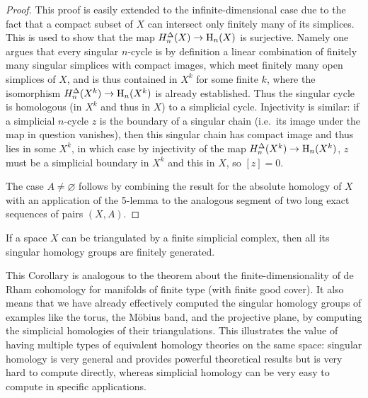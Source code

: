 \begin{proof}
    This proof is easily extended to the infinite-dimensional case due to the fact that a compact subset of $X$ can intersect only finitely many of its simplices. This is used to show that the map $H^\Delta_n(X)\to \mathrm{H}_n(X)$ is surjective. Namely one argues that every singular $n$-cycle is by definition a linear combination of finitely many singular simplices with compact images, which meet finitely many open simplices of $X$, and is thus contained in $X^k$ for some finite $k$, where the isomorphism $H^\Delta_n(X^k)\to \mathrm{H}_n(X^k)$ is already established. Thus the singular cycle is homologous (in $X^k$ and thus in $X$) to a simplicial cycle. Injectivity is similar: if a simplicial $n$-cycle $z$ is the boundary of a singular chain (i.e.\ its image under the map in question vanishes), then this singular chain has compact image and thus lies in some $X^k$, in which case by injectivity of the map $H^\Delta_n(X^k)\to \mathrm{H}_n(X^k)$, $z$ must be a simplicial boundary in $X^k$ and this in $X$, so $[z]=0$. 
    
    The case $A\neq\varnothing$ follows by combining the result for the absolute homology of $X$ with an application of the 5-lemma to the analogous segment of two long exact sequences of pairs $(X,A)$.
\end{proof}

\begin{cor}
    If a space $X$ can be triangulated by a finite simplicial complex, then all its singular homology groups are finitely generated.
\end{cor}

This Corollary is analogous to the theorem about the finite-dimensionality of de Rham cohomology for manifolds of finite type (with finite good cover). It also means that we have already effectively computed the singular homology groups of examples like the torus, the M\"obius band, and the projective plane, by computing the simplicial homologies of their triangulations. This illustrates the value of having multiple types of equivalent homology theories on the same space: singular homology is very general and provides powerful theoretical results but is very hard to compute directly, whereas simplicial homology can be very easy to compute in specific applications.

